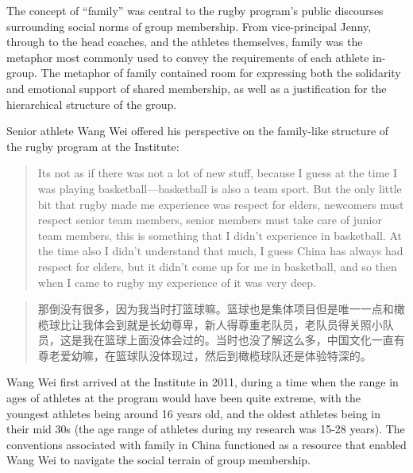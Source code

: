 \begin{CJK}{UTF8}{gbsn}
The concept of ``family'' was central to the rugby program's public discourses surrounding social norms of group membership.  From vice-principal Jenny, through to the head coaches, and the athletes themselves, family was the metaphor most commonly used to convey the requirements of each athlete in-group.  The metaphor of family contained room for expressing both the solidarity and emotional support of shared membership, as well as a justification for the hierarchical structure of the group.

Senior athlete Wang Wei offered his perspective on the family-like structure of the rugby program at the Institute:

  \begin{quotation}
    Its not as if there was not a lot of new stuff, because I guess at the time I was playing basketball---basketball is also a team sport.  But the only little bit that rugby made me experience was respect for elders, newcomers must respect senior team members, senior members must take care of junior team members, this is something that I didn’t experience in basketball.  At the time also I didn’t understand that much, I guess China has always had respect for elders, but it didn’t come up for me in basketball, and so then when I came to rugby my experience of it was very deep.
  \end{quotation}

  \begin{quotation}
     那倒没有很多，因为我当时打篮球嘛。篮球也是集体项目但是唯一一点和橄榄球比让我体会到就是长幼尊卑，新人得尊重老队员，老队员得关照小队员，这是我在篮球上面没体会过的。当时也没了解这么多，中国文化一直有尊老爱幼嘛，在篮球队没体现过，然后到橄榄球队还是体验特深的。
  \end{quotation}

Wang Wei first arrived at the Institute in 2011, during a time when the range in ages of athletes at the program would have been quite extreme, with the youngest athletes being around 16 years old, and the oldest athletes being in their mid 30s (the age range of athletes during my research was 15-28 years).  The conventions associated with family in China functioned as a resource that enabled Wang Wei to navigate the social terrain of group membership.


\end{CJK}
